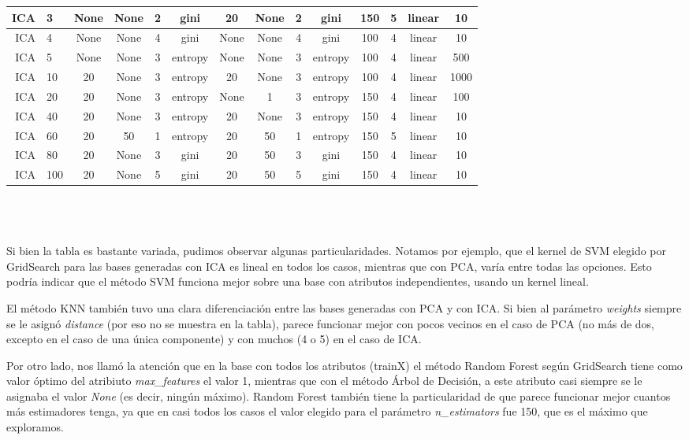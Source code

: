 \documentclass[10pt, a4paper]{article}
\begin{document}
\begin{scriptsize}
\begin{tabular}{|r|l||c|c|c|c||c|c|c|c|c||c||c|c|}
\hline
ICA & 3 & None & None & 2 & gini & 20 & None & 2 & gini & 150 & 5 & linear & 10 \\
\hline
ICA & 4 & None & None & 4 & gini & None & None & 4 & gini & 100 & 4 & linear & 10 \\
\hline
ICA & 5 & None & None & 3 & entropy & None & None & 3 & entropy & 100 & 4 & linear & 500 \\
\hline
ICA & 10 & 20 & None & 3 & entropy & 20 & None & 3 & entropy & 100 & 4 & linear & 1000 \\
\hline
ICA & 20 & 20 & None & 3 & entropy & None & 1 & 3 & entropy & 150 & 4 & linear & 100 \\
\hline
ICA & 40 & 20 & None & 3 & entropy & 20 & None & 3 & entropy & 150 & 4 & linear & 10 \\
\hline
ICA & 60 & 20 & 50 & 1 & entropy & 20 & 50 & 1 & entropy & 150 & 5 & linear & 10 \\
\hline
ICA & 80 & 20 & None & 3 & gini & 20 & 50 & 3 & gini & 150 & 4 & linear & 10 \\
\hline
ICA & 100 & 20 & None & 5 & gini & 20 & 50 & 5 & gini & 150 & 4 & linear & 10 \\
\hline
\end{tabular}
\end{scriptsize}
\\\\\\
Si bien la tabla es bastante variada, pudimos observar algunas particularidades. Notamos por ejemplo, que el kernel de SVM elegido por GridSearch para las bases generadas con ICA es lineal en todos los casos, mientras que con PCA, varía entre todas las opciones. Esto podría indicar que el método SVM funciona mejor sobre una base con atributos independientes, usando un kernel lineal.

El método KNN también tuvo una clara diferenciación entre las bases generadas con PCA y con ICA. Si bien al parámetro \textit{weights} siempre se le asignó \textit{distance} (por eso no se muestra en la tabla), parece funcionar mejor con pocos vecinos en el caso de PCA (no más de dos, excepto en el caso de una única componente) y con muchos (4 o 5) en el caso de ICA.

Por otro lado, nos llamó la atención que en la base con todos los atributos (trainX) el método Random Forest según GridSearch tiene como valor óptimo del atribiuto \textit{max\_features} el valor 1, mientras que con el método Árbol de Decisión, a este atributo casi siempre se le asignaba el valor \textit{None} (es decir, ningún máximo). Random Forest también tiene la particularidad de que parece funcionar mejor cuantos más estimadores tenga, ya que en casi todos los casos el valor elegido para el parámetro \textit{n\_estimators} fue 150, que es el máximo que exploramos.
\end{document}

